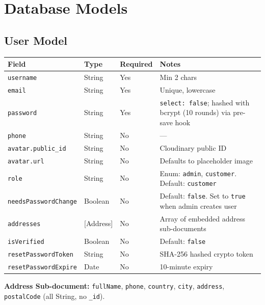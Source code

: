 \chapter{Database Models}

\section{User Model}

\begin{longtable}{@{}p{3.5cm}p{3cm}p{2cm}p{5.5cm}@{}}
  \toprule
  \textbf{Field} & \textbf{Type} & \textbf{Required} & \textbf{Notes} \\
  \midrule
  \texttt{username}       & String     & Yes & Min 2 chars \\
  \texttt{email}          & String     & Yes & Unique, lowercase \\
  \texttt{password}       & String     & Yes & \texttt{select: false}; hashed with bcrypt (10 rounds) via pre-save hook \\
  \texttt{phone}          & String     & No  & --- \\
  \texttt{avatar.public\_id} & String  & No  & Cloudinary public ID \\
  \texttt{avatar.url}     & String     & No  & Defaults to placeholder image \\
  \texttt{role}           & String     & No  & Enum: \texttt{admin}, \texttt{customer}. Default: \texttt{customer} \\
  \texttt{needsPasswordChange} & Boolean & No & Default: \texttt{false}. Set to \texttt{true} when admin creates user \\
  \texttt{addresses}      & [Address]  & No  & Array of embedded address sub-documents \\
  \texttt{isVerified}     & Boolean    & No  & Default: \texttt{false} \\
  \texttt{resetPasswordToken} & String & No  & SHA-256 hashed crypto token \\
  \texttt{resetPasswordExpire} & Date  & No  & 10-minute expiry \\
  \bottomrule
\end{longtable}

\textbf{Address Sub-document:} \texttt{fullName}, \texttt{phone}, \texttt{country}, \texttt{city}, \texttt{address}, \texttt{postalCode} (all String, no \texttt{\_id}).

